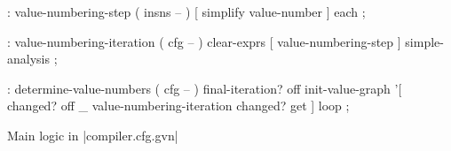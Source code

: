 \centering

  \begin{factorcode}
    : value-numbering-step ( insns -- )
        [ simplify value-number ] each ;

    : value-numbering-iteration ( cfg -- )
        clear-exprs [ value-numbering-step ] simple-analysis ;

    : determine-value-numbers ( cfg -- )
        final-iteration? off
        init-value-graph
        '[
            changed? off
            _ value-numbering-iteration
            changed? get
        ] loop ;
  \end{factorcode}

\caption{Main logic in \factor|compiler.cfg.gvn|}
